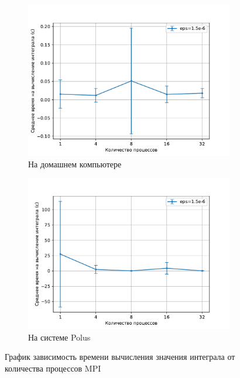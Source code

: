 \documentclass{article}
\begin{document}
\begin{figure}[!t]
\centering
\begin{subfigure}[b]{0.49\textwidth}
    \centering
    \includegraphics[width=\textwidth,trim=0 0 0 0,clip]{1.5e-6_home_pc_time.pdf}
    \caption{На домашнем компьютере}
    \label{img:1.1}
\end{subfigure}
\begin{subfigure}[b]{0.49\textwidth}
    \centering
    \includegraphics[width=\textwidth,trim=0 0 0 0,clip]{1.5e-6_polus_time.pdf}
    \caption{На системе Polus}
    \label{img:1.2}
\end{subfigure}
\caption{График зависимость времени вычисления значения интеграла от количества процессов MPI}
\end{figure}
\end{document}
